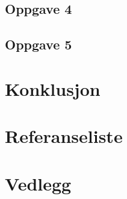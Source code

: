 \documentclass{article}
\begin{document}
\subsection{Oppgave 4} %
\label{sub:oppgave_4}

\clearpage


\subsection{Oppgave 5} %
\label{sub:oppgave_5}

\clearpage





\section{Konklusjon} %
\label{sec:konklusjon}

\newpage

\newpage
\section{Referanseliste}



\section{Vedlegg} %
\label{sec:vedlegg}

\end{document}
